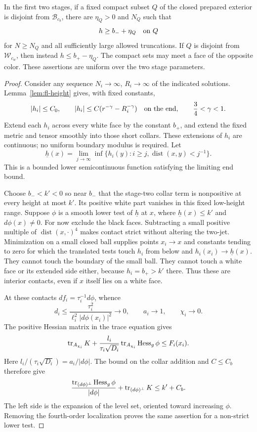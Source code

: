 \begin{lemma}
\label{lem:fc-compact-separation}
In the first two stages, if a fixed compact subset $Q$ of the closed
prepared exterior is disjoint from $\mathcal B_{c_b}$, there are
$\eta_Q>0$ and $N_Q$ such that
\[
 h\ge b_-+\eta_Q\quad\hbox{on }Q
\]
for $N\ge N_Q$ and all sufficiently large allowed truncations.
If $Q$ is disjoint from $\mathcal W_{c_w}$, then instead
$h\le b_+-\eta_Q$.  The compact sets may meet a face of the opposite
color.  These assertions are uniform over the two stage parameters.
\end{lemma}

\begin{proof}
Consider any sequence $N_i\to\infty$, $R_i\to\infty$ of the
indicated solutions.  Lemma~\ref{lem:fl-height} gives, with fixed
constants,
\begin{equation}\label{eq:fc-height-sequence}
 |h_i|\le C_0,
 \qquad |h_i|\le C(r^{-\gamma}-R_i^{-\gamma})
 \quad\hbox{on the end},\qquad \frac34<\gamma<1.
\end{equation}
Extend each $h_i$ across every white face by the constant $b_+$,
and extend the fixed metric and tensor smoothly into those short
collars.  These extensions of $h_i$ are continuous; no uniform
boundary modulus is required.  Let
\[
 \underline h(x)=
 \lim_{j\to\infty}\inf\{h_i(y):i\ge j,
                         \operatorname{dist}(x,y)<j^{-1}\}.
\]
This is a bounded lower semicontinuous function satisfying the
limiting end bound.

Choose $b_-<k'<0$ so near $b_-$ that the stage-two collar term is
nonpositive at every height at most $k'$.  Its positive white part
vanishes in this fixed low-height range.  Suppose $\phi$ is a smooth
lower test of $\underline h$ at $x$, where
$\underline h(x)\le k'$ and $d\phi(x)\ne0$.  For now exclude the
black faces.  Subtracting a small positive multiple of
$\operatorname{dist}(x,\cdot)^4$ makes contact strict without
altering the two-jet.  Minimization on a small closed ball supplies
points $x_i\to x$ and constants tending to zero for which the
translated tests touch $h_i$ from below and
$h_i(x_i)\to\underline h(x)$.  They cannot touch the boundary of
the small ball.  They cannot touch a white face or its extended
side either, because $h_i=b_+>k'$ there.  Thus these are interior
contacts, even if $x$ itself lies on a white face.

At these contacts $df_i=\tau_i^{-1}d\phi$, whence
\[
 d_i\le\frac{\tau_i^2}{\ell_i^2|d\phi(x_i)|^2}\longrightarrow0,
 \qquad a_i\longrightarrow1,\qquad\chi_i\longrightarrow0.
\]
The positive Hessian matrix in the trace equation gives
\[
 \operatorname{tr}_{A_{\chi_i}}K+
 \frac{l_i}{\tau_i\sqrt{D_i}}
       \operatorname{tr}_{A_{\chi_i}}\operatorname{Hess}_g\phi
 \le F_i(x_i).
\]
Here $l_i/(\tau_i\sqrt{D_i})=a_i/|d\phi|$.  The bound on the
collar addition and $C\le C_b$ therefore give
\begin{equation}\label{eq:fc-test-expansion}
 \frac{\operatorname{tr}_{(d\phi)^\perp}\operatorname{Hess}_g\phi}{|d\phi|}
       +\operatorname{tr}_{(d\phi)^\perp}K\le k'+C_b.
\end{equation}
The left side is the expansion of the level set, oriented toward
increasing $\phi$.  Removing the fourth-order localization proves
the same assertion for a non-strict lower test.


\end{proof}
